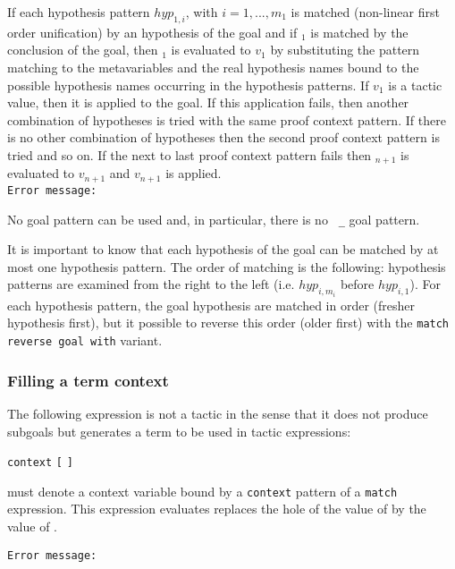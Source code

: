
If each hypothesis pattern $hyp_{1,i}$, with $i=1,...,m_1$
is matched (non-linear first order unification) by an hypothesis of
the goal and if {\cpattern}$_1$ is matched by the conclusion of the
goal, then {\tacexpr}$_1$ is evaluated to $v_1$ by substituting the
pattern matching to the metavariables and the real hypothesis names
bound to the possible hypothesis names occurring in the hypothesis
patterns. If $v_1$ is a tactic value, then it is applied to the
goal. If this application fails, then another combination of
hypotheses is tried with the same proof context pattern. If there is
no other combination of hypotheses then the second proof context
pattern is tried and so on. If the next to last proof context pattern
fails then {\tacexpr}$_{n+1}$ is evaluated to $v_{n+1}$ and $v_{n+1}$
is applied.\\

{\tt Error message:}\\


No goal pattern can be used and, in particular, there is no {\tt
\_} goal pattern.

It is important to know that each hypothesis of the goal can be
matched by at most one hypothesis pattern. The order of matching is
the following: hypothesis patterns are examined from the right to the
left (i.e. $hyp_{i,m_i}$ before $hyp_{i,1}$). For each hypothesis
pattern, the goal hypothesis are matched in order (fresher hypothesis
first), but it possible to reverse this order (older first) with
the {\tt match reverse goal with} variant.

\subsubsection{Filling a term context}

The following expression is not a tactic in the sense that it does not
produce subgoals but generates a term to be used in tactic
expressions:

{\tt context} {\ident} {\tt [} {\tacexpr} {\tt ]}

{\ident} must denote a context variable bound by a {\tt context}
pattern of a {\tt match} expression. This expression evaluates
replaces the hole of the value of {\ident} by the value of
{\tacexpr}.

{\tt Error message:}\\

